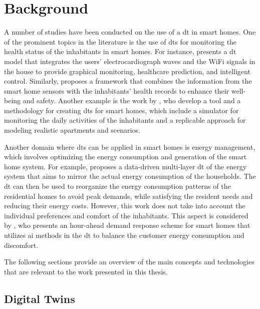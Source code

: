 \chapter{Background}\label{ch:background}

A number of studies have been conducted on the use of a \acrfull{dt} in smart homes. One of the prominent topics in the literature is the use of \acrshort{dt}s for monitoring the health status of the inhabitants in smart homes. For instance, \cite{chenDigitalTwinEmpowered2023} presents a \acrshort{dt} model that integrates the users' electrocardiograph waves and the WiFi signals in the house to provide graphical monitoring, healthcare prediction, and intelligent control. Similarly, \cite{shoukatSmartHomeEnhanced2023} proposes a framework that combines the information from the smart home sensors with the inhabitants' health records to enhance their well-being and safety. Another example is the work by \cite{bouchabouSmartHomeDigital2023}, who develop a tool and a methodology for creating \acrshort{dt}s for smart homes, which include a simulator for monitoring the daily activities of the inhabitants and a replicable approach for modeling realistic apartments and scenarios.

Another domain where \acrshort{dt}s can be applied in smart homes is energy management, which involves optimizing the energy consumption and generation of the smart home system. For example, \cite{fathyDigitalTwinDrivenDecision2021} proposes a data-driven multi-layer \acrshort{dt} of the energy system that aims to mirror the actual energy consumption of the households. The \acrshort{dt} can then be used to reorganize the energy consumption patterns of the residential homes to avoid peak demands, while satisfying the resident needs and reducing their energy costs. However, this work does not take into account the individual preferences and comfort of the inhabitants. This aspect is considered by \cite{huangMachineLearningbasedDemand2023}, who presents an hour-ahead demand response scheme for smart homes that utilizes \acrshort{ai} methods in the \acrshort{dt} to balance the customer energy consumption and discomfort.

The following sections provide an overview of the main concepts and technologies that are relevant to the work presented in this thesis.

\newpage

\section{Digital Twins}

